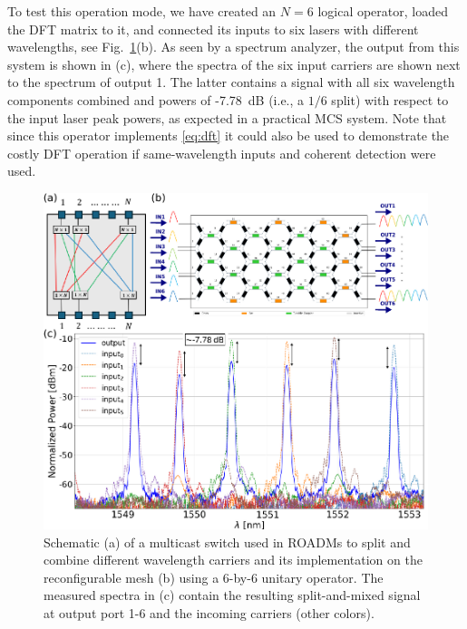 To test this operation mode, we have created an $N=6$ logical operator, loaded the DFT matrix to it, and connected its inputs to six lasers with different wavelengths, see Fig.~\ref{fig:multicast}(b).
As seen by a spectrum analyzer, the output from this system is shown in (c), where the spectra of the six input carriers are shown next to the spectrum of output 1.
The latter contains a signal with all six wavelength components combined and powers of -7.78~dB (i.e., a $1/6$ split) with respect to the input laser peak powers, as expected in a practical MCS system.
Note that since this operator implements \eqref{eq:dft} it could also be used to demonstrate the costly DFT operation if same-wavelength inputs and coherent detection were used.

\begin{figure}[h]
	\centering
	\includegraphics{figures/ch4-mcs.pdf}
	\caption{Schematic (a) of a multicast switch used in ROADMs to split and combine different wavelength carriers and its implementation on the reconfigurable mesh (b) using a 6-by-6 unitary operator.
		The measured spectra in (c) contain the resulting split-and-mixed signal at output port 1-6 and the incoming carriers (other colors).
	}
	\label{fig:multicast}
\end{figure}


